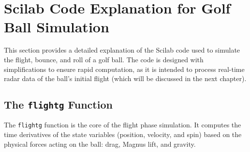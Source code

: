 \documentclass[10pt,a4paper]{report}
\begin{document}
\section{Scilab Code Explanation for Golf Ball Simulation}
\label{sec:scilab_code}

This section provides a detailed explanation of the Scilab code used to simulate the flight, bounce, and roll of a golf ball. The code is designed with simplifications to ensure rapid computation, as it is intended to process real-time radar data of the ball's initial flight (which will be discussed in the next chapter).

\bigskip
\subsection{The \texttt{flightg} Function}
\label{subsec:flightg}

The \texttt{flightg} function is the core of the flight phase simulation. It computes the time derivatives of the state variables (position, velocity, and spin) based on the physical forces acting on the ball: drag, Magnus lift, and gravity.
\end{document}
